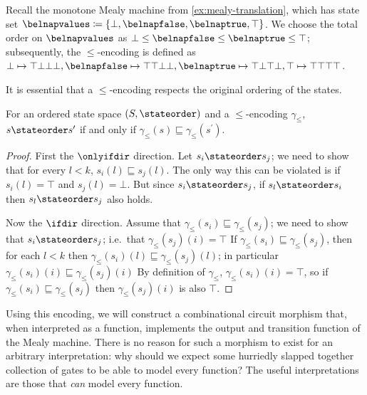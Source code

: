 \begin{example}
    Recall the monotone Mealy machine from \cref{ex:mealy-translation}, which
    has state set \(
    \belnapvalues \coloneqq \{\bot,\belnapfalse,\belnaptrue,\top\}
    \).
    We choose the total order on \(\belnapvalues\) as
    \(\bot \leq \belnapfalse \leq \belnaptrue \leq \top\); subsequently, the
    \(\leq\)-encoding is defined as \(
    \bot \mapsto \top\bot\bot\bot, \belnapfalse \mapsto \top\top\bot\bot,
    \belnaptrue \mapsto \top\bot\top\bot, \top \mapsto \top\top\top\top
    \).
\end{example}

It is essential that a \(\leq\)-encoding respects the original ordering of the
states.

\begin{lemma}
    For an ordered state space \((S,\stateorder)\) and a \(\leq\)-encoding
    \(\gamma_\leq\), \(s \stateorder s^\prime\) if and only if
    \(\gamma_\leq(s) \sqsubseteq \gamma_\leq(s^\prime)\).
\end{lemma}
\begin{proof}
    First the \(\onlyifdir\) direction.
    Let \(s_i \stateorder s_j\); we need to show that for every \(l < k\),
    \(s_i(l) \sqsubseteq s_j(l)\).
    The only way this can be violated is if \(s_i(l) = \top\) and
    \(s_j(l) = \bot\).
    But since \(s_i \stateorder s_j\), if \(s_l \stateorder s_i\) then
    \(s_l \stateorder s_j\) also holds.

    Now the \(\ifdir\) direction.
    Assume that \(\gamma_\leq(s_i) \sqsubseteq \gamma_\leq(s_j)\); we need to
    show that \(s_i \stateorder s_j\); i.e.\ that \(\gamma_\leq(s_j)(i) = \top\)
    If \(\gamma_\leq(s_i) \sqsubseteq \gamma_\leq(s_j)\), then for each
    \(l < k\) then \(\gamma_\leq(s_i)(l) \sqsubseteq \gamma_\leq(s_j)(l)\);
    in particular \(\gamma_\leq(s_i)(i) \sqsubseteq \gamma_\leq(s_j)(i)\)
    By definition of \(\gamma_\leq\), \(\gamma_\leq(s_i)(i) = \top\), so if
    \(\gamma_\leq(s_i) \sqsubseteq \gamma_\leq(s_j)\) then
    \(\gamma_\leq(s_j)(i)\) is also \(\top\).
\end{proof}

Using this encoding, we will construct a combinational circuit morphism that,
when interpreted as a function, implements the output and transition function
of the Mealy machine.
There is no reason for such a morphism to exist for an arbitrary interpretation:
why should we expect some hurriedly slapped together collection of gates to be
able to model every function?
The useful interpretations are those that \emph{can} model every function.

